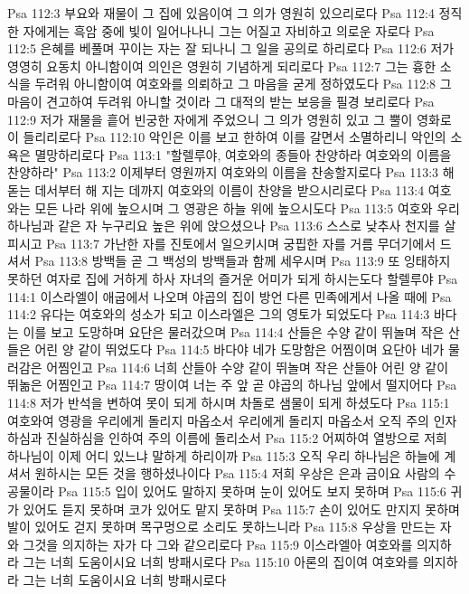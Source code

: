 Psa 112:3  부요와 재물이 그 집에 있음이여 그 의가 영원히 있으리로다
Psa 112:4  정직한 자에게는 흑암 중에 빛이 일어나나니 그는 어질고 자비하고 의로운 자로다
Psa 112:5  은혜를 베풀며 꾸이는 자는 잘 되나니 그 일을 공의로 하리로다
Psa 112:6  저가 영영히 요동치 아니함이여 의인은 영원히 기념하게 되리로다
Psa 112:7  그는 흉한 소식을 두려워 아니함이여 여호와를 의뢰하고 그 마음을 굳게 정하였도다
Psa 112:8  그 마음이 견고하여 두려워 아니할 것이라 그 대적의 받는 보응을 필경 보리로다
Psa 112:9  저가 재물을 흩어 빈궁한 자에게 주었으니 그 의가 영원히 있고 그 뿔이 영화로이 들리리로다
Psa 112:10  악인은 이를 보고 한하여 이를 갈면서 소멸하리니 악인의 소욕은 멸망하리로다
Psa 113:1  "할렐루야, 여호와의 종들아 찬양하라 여호와의 이름을 찬양하라"
Psa 113:2  이제부터 영원까지 여호와의 이름을 찬송할지로다
Psa 113:3  해 돋는 데서부터 해 지는 데까지 여호와의 이름이 찬양을 받으시리로다
Psa 113:4  여호와는 모든 나라 위에 높으시며 그 영광은 하늘 위에 높으시도다
Psa 113:5  여호와 우리 하나님과 같은 자 누구리요 높은 위에 앉으셨으나
Psa 113:6  스스로 낮추사 천지를 살피시고
Psa 113:7  가난한 자를 진토에서 일으키시며 궁핍한 자를 거름 무더기에서 드셔서
Psa 113:8  방백들 곧 그 백성의 방백들과 함께 세우시며
Psa 113:9  또 잉태하지 못하던 여자로 집에 거하게 하사 자녀의 즐거운 어미가 되게 하시는도다 할렐루야
Psa 114:1  이스라엘이 애굽에서 나오며 야곱의 집이 방언 다른 민족에게서 나올 때에
Psa 114:2  유다는 여호와의 성소가 되고 이스라엘은 그의 영토가 되었도다
Psa 114:3  바다는 이를 보고 도망하며 요단은 물러갔으며
Psa 114:4  산들은 수양 같이 뛰놀며 작은 산들은 어린 양 같이 뛰었도다
Psa 114:5  바다야 네가 도망함은 어찜이며 요단아 네가 물러감은 어찜인고
Psa 114:6  너희 산들아 수양 같이 뛰놀며 작은 산들아 어린 양 같이 뛰놂은 어찜인고
Psa 114:7  땅이여 너는 주 앞 곧 야곱의 하나님 앞에서 떨지어다
Psa 114:8  저가 반석을 변하여 못이 되게 하시며 차돌로 샘물이 되게 하셨도다
Psa 115:1  여호와여 영광을 우리에게 돌리지 마옵소서 우리에게 돌리지 마옵소서 오직 주의 인자하심과 진실하심을 인하여 주의 이름에 돌리소서
Psa 115:2  어찌하여 열방으로 저희 하나님이 이제 어디 있느냐 말하게 하리이까
Psa 115:3  오직 우리 하나님은 하늘에 계셔서 원하시는 모든 것을 행하셨나이다
Psa 115:4  저희 우상은 은과 금이요 사람의 수공물이라
Psa 115:5  입이 있어도 말하지 못하며 눈이 있어도 보지 못하며
Psa 115:6  귀가 있어도 듣지 못하며 코가 있어도 맡지 못하며
Psa 115:7  손이 있어도 만지지 못하며 발이 있어도 걷지 못하며 목구멍으로 소리도 못하느니라
Psa 115:8  우상을 만드는 자와 그것을 의지하는 자가 다 그와 같으리로다
Psa 115:9  이스라엘아 여호와를 의지하라 그는 너희 도움이시요 너희 방패시로다
Psa 115:10  아론의 집이여 여호와를 의지하라 그는 너희 도움이시요 너희 방패시로다
